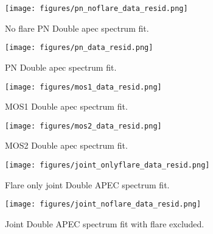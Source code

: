 \documentclass[twocolumn]{aastex631}
\begin{document}
\begin{figure}
    \begin{centering}
        \texttt{[image: figures/pn\_noflare\_data\_resid.png]}
        \caption{
         No flare PN Double apec spectrum fit.
        }
        \label{fig:spec_pn_noflare}
    \end{centering}
\end{figure}

\begin{figure}
    \begin{centering}
        \texttt{[image: figures/pn\_data\_resid.png]}
        \caption{
         PN Double apec spectrum fit.
        }
        \label{fig:spec_pn}
    \end{centering}
\end{figure}

\begin{figure}
    \begin{centering}
        \texttt{[image: figures/mos1\_data\_resid.png]}
        \caption{
         MOS1 Double apec spectrum fit.
        }
        \label{fig:spec_mos1}
    \end{centering}
\end{figure}

\begin{figure}
    \begin{centering}
        \texttt{[image: figures/mos2\_data\_resid.png]}
        \caption{
         MOS2 Double apec spectrum fit.
        }
        \label{fig:spec_mos2}
    \end{centering}
\end{figure}

\begin{figure}
    \begin{centering}
        \texttt{[image: figures/joint\_onlyflare\_data\_resid.png]}
        \caption{
         Flare only joint Double APEC spectrum fit.
        }
        \label{fig:spec_joint_onlyflare}
    \end{centering}
\end{figure}


\begin{figure}
    \begin{centering}
        \texttt{[image: figures/joint\_noflare\_data\_resid.png]}
        \caption{
         Joint Double APEC spectrum fit with flare excluded.
        }
        \label{fig:spec_joint_noflare}
    \end{centering}
\end{figure}
\end{document}
